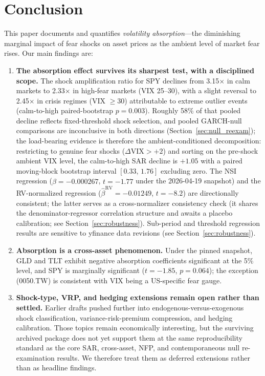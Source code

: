 \documentclass[12pt,a4paper]{article}
\begin{document}
\section{Conclusion}
\label{sec:conclusion}

This paper documents and quantifies \textit{volatility absorption}---the diminishing marginal impact of fear shocks on asset prices as the ambient level of market fear rises. Our main findings are:

\begin{enumerate}
    \item \textbf{The absorption effect survives its sharpest test, with a disciplined scope.} The shock amplification ratio for SPY declines from 3.15$\times$ in calm markets to 2.33$\times$ in high-fear markets (VIX 25--30), with a slight reversal to 2.45$\times$ in crisis regimes (VIX $\geq 30$) attributable to extreme outlier events (calm-to-high paired-bootstrap $p = 0.003$). Roughly 58\% of that pooled decline reflects fixed-threshold shock selection, and pooled GARCH-null comparisons are inconclusive in both directions (Section~\ref{sec:null_reexam}); the load-bearing evidence is therefore the ambient-conditioned decomposition: restricting to genuine fear shocks ($\Delta\text{VIX} > +2$) and sorting on the pre-shock ambient VIX level, the calm-to-high SAR decline is $+1.05$ with a paired moving-block bootstrap interval $[0.33,\,1.76]$ excluding zero. The NSI regression ($\hat{\beta} = -0.000267$, $t = -1.77$ under the 2026-04-19 snapshot) and the RV-normalized regression ($\hat{\beta}^{\text{RV}} = -0.01249$, $t = -8.2$) are directionally consistent; the latter serves as a cross-normalizer consistency check (it shares the denominator-regressor correlation structure and awaits a placebo calibration; see Section~\ref{sec:robustness}). Sub-period and threshold regression results are sensitive to yfinance data revisions (see Section~\ref{sec:robustness}).

    \item \textbf{Absorption is a cross-asset phenomenon.} Under the pinned snapshot, GLD and TLT exhibit negative absorption coefficients significant at the 5\% level, and SPY is marginally significant ($t = -1.85$, $p = 0.064$); the exception (0050.TW) is consistent with VIX being a US-specific fear gauge.

    \item \textbf{Shock-type, VRP, and hedging extensions remain open rather than settled.} Earlier drafts pushed further into endogenous-versus-exogenous shock classification, variance-risk-premium compression, and hedging calibration. Those topics remain economically interesting, but the surviving archived package does not yet support them at the same reproducibility standard as the core SAR, cross-asset, NFP, and contemporaneous null re-examination results. We therefore treat them as deferred extensions rather than as headline findings.
\end{enumerate}
\end{document}
